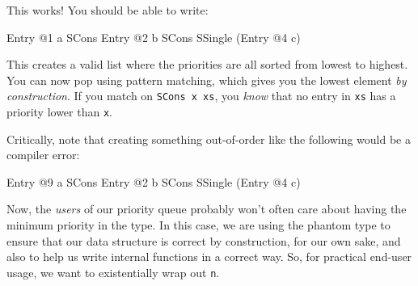 \documentclass[]{article}
\newenvironment{Shaded}{}{}
\newcommand{\CharTok}[1]{\textcolor[rgb]{0.25,0.44,0.63}{#1}}
\newcommand{\DataTypeTok}[1]{\textcolor[rgb]{0.56,0.13,0.00}{#1}}
\newcommand{\DecValTok}[1]{\textcolor[rgb]{0.25,0.63,0.44}{#1}}
\newcommand{\NormalTok}[1]{#1}
\newcommand{\OperatorTok}[1]{\textcolor[rgb]{0.40,0.40,0.40}{#1}}
\newcommand{\OtherTok}[1]{\textcolor[rgb]{0.00,0.44,0.13}{#1}}
\begin{document}
This works! You should be able to write:

\begin{Shaded}
\begin{Highlighting}[]
\DataTypeTok{Entry} \OperatorTok{@}\DecValTok{1} \CharTok{\textquotesingle{}a\textquotesingle{}} \OtherTok{\textasciigrave{}SCons\textasciigrave{}} \DataTypeTok{Entry} \OperatorTok{@}\DecValTok{2} \CharTok{\textquotesingle{}b\textquotesingle{}} \OtherTok{\textasciigrave{}SCons\textasciigrave{}} \DataTypeTok{SSingle}\NormalTok{ (}\DataTypeTok{Entry} \OperatorTok{@}\DecValTok{4} \CharTok{\textquotesingle{}c\textquotesingle{}}\NormalTok{)}
\end{Highlighting}
\end{Shaded}

This creates a valid list where the priorities are all sorted from lowest to
highest. You can now pop using pattern matching, which gives you the lowest
element \emph{by construction}. If you match on \texttt{SCons\ x\ xs}, you
\emph{know} that no entry in \texttt{xs} has a priority lower than \texttt{x}.

Critically, note that creating something out-of-order like the following would
be a compiler error:

\begin{Shaded}
\begin{Highlighting}[]
\DataTypeTok{Entry} \OperatorTok{@}\DecValTok{9} \CharTok{\textquotesingle{}a\textquotesingle{}} \OtherTok{\textasciigrave{}SCons\textasciigrave{}} \DataTypeTok{Entry} \OperatorTok{@}\DecValTok{2} \CharTok{\textquotesingle{}b\textquotesingle{}} \OtherTok{\textasciigrave{}SCons\textasciigrave{}} \DataTypeTok{SSingle}\NormalTok{ (}\DataTypeTok{Entry} \OperatorTok{@}\DecValTok{4} \CharTok{\textquotesingle{}c\textquotesingle{}}\NormalTok{)}
\end{Highlighting}
\end{Shaded}

Now, the \emph{users} of our priority queue probably won't often care about
having the minimum priority in the type. In this case, we are using the phantom
type to ensure that our data structure is correct by construction, for our own
sake, and also to help us write internal functions in a correct way. So, for
practical end-user usage, we want to existentially wrap out \texttt{n}.
\end{document}
